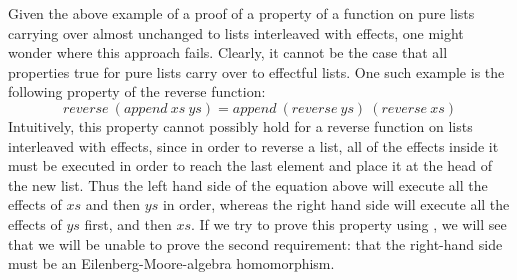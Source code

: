 Given the above example of a proof of a property of a function on pure
lists carrying over almost unchanged to lists interleaved with
effects, one might wonder where this approach fails. Clearly, it
cannot be the case that all properties true for pure lists carry over
to effectful lists. One such example is the following property of the
reverse function:
\begin{displaymath}
  \mathit{reverse}~(\mathit{append}~\mathit{xs}~\mathit{ys}) = \mathit{append}~(\mathit{reverse}~\mathit{ys})~(\mathit{reverse}~\mathit{xs})
\end{displaymath}
Intuitively, this property cannot possibly hold for a reverse function
on lists interleaved with effects, since in order to reverse a list,
all of the effects inside it must be executed in order to reach the
last element and place it at the head of the new list. Thus the left
hand side of the equation above will execute all the effects of
$\mathit{xs}$ and then $\mathit{ys}$ in order, whereas the right hand
side will execute all the effects of $\mathit{ys}$ first, and then
$\mathit{xs}$. If we try to prove this property using
, we will see that we will be unable
to prove the second requirement: that the right-hand side must be an
Eilenberg-Moore-algebra homomorphism.

